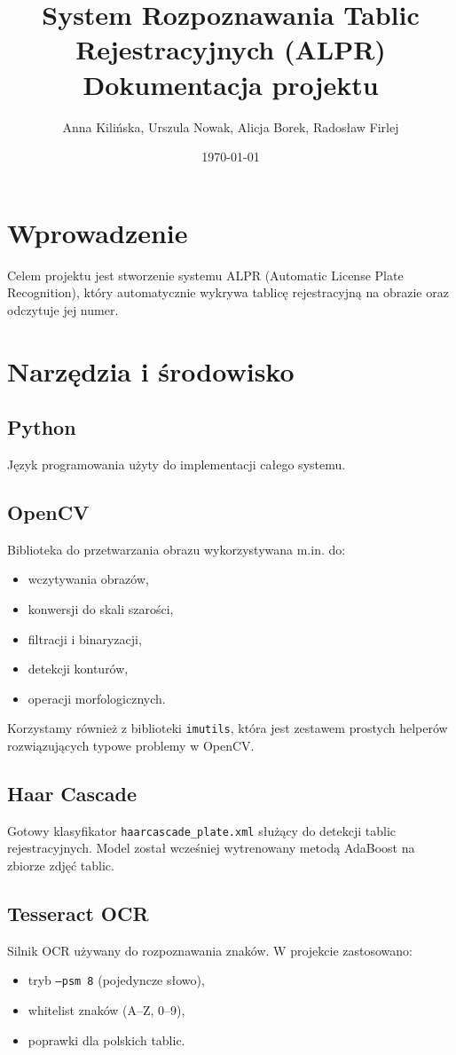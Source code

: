 \documentclass[12pt,a4paper]{article}
\title{
    \textbf{System Rozpoznawania Tablic Rejestracyjnych (ALPR)}\\
    Dokumentacja projektu
}
\author{Anna Kilińska, Urszula Nowak, Alicja Borek, Radosław Firlej}
\date{\today}
\begin{document}
\maketitle
\tableofcontents
\newpage

\section{Wprowadzenie}

Celem projektu jest stworzenie systemu ALPR (Automatic License Plate Recognition), który automatycznie wykrywa tablicę rejestracyjną na obrazie oraz odczytuje jej numer. 

\section{Narzędzia i środowisko}

\subsection{Python}
Język programowania użyty do implementacji całego systemu.

\subsection{OpenCV}
Biblioteka do przetwarzania obrazu wykorzystywana m.in. do:
\begin{itemize}
    \item wczytywania obrazów,
    \item konwersji do skali szarości,
    \item filtracji i binaryzacji,
    \item detekcji konturów,
    \item operacji morfologicznych.
\end{itemize}
Korzystamy również z biblioteki \texttt{imutils}, która jest zestawem prostych helperów rozwiązujących typowe problemy w OpenCV.

\subsection{Haar Cascade}
Gotowy klasyfikator \texttt{haarcascade\_plate.xml} służący do detekcji tablic rejestracyjnych.  
Model został wcześniej wytrenowany metodą AdaBoost na zbiorze zdjęć tablic.

\subsection{Tesseract OCR}
Silnik OCR używany do rozpoznawania znaków.  
W projekcie zastosowano:
\begin{itemize}
    \item tryb \texttt{--psm 8} (pojedyncze słowo),
    \item whitelist znaków (A--Z, 0--9),
    \item poprawki dla polskich tablic.
\end{itemize}
\end{document}
